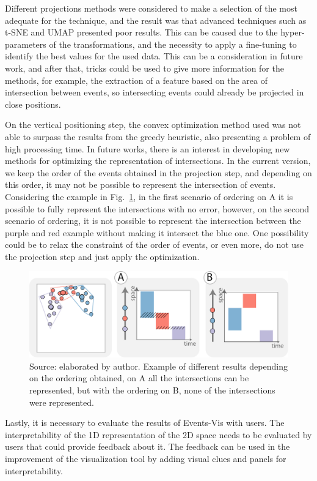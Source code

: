 Different projections methods were considered to make a selection of the most adequate for the technique, and the result was that advanced techniques such as t-SNE and UMAP presented poor results.
%
This can be caused due to the hyper-parameters of the transformations, and the necessity to apply a fine-tuning to identify the best values for the used data.
%
This can be a consideration in future work, and after that, tricks could be used to give more information for the methods, for example, the extraction of a feature based on the area of intersection between events, so intersecting events could already be projected in close positions.  

On the vertical positioning step, the convex optimization method used was not able to surpass the results from the greedy heuristic, also presenting a problem of high processing time.
%
In future works, there is an interest in developing new methods for optimizing the representation of intersections.
%
In the current version, we keep the order of the events obtained in the projection step, and depending on this order, it may not be possible to represent the intersection of events. 
%
Considering the example in Fig.~\ref{fig:discussion-projection-error}, in the first scenario of ordering on A it is possible to fully represent the intersections with no error, however, on the second scenario of ordering, it is not possible to represent the intersection between the purple and red example without making it intersect the blue one. 
%
One possibility could be to relax the constraint of the order of events, or even more, do not use the projection step and just apply the optimization.

\begin{figure}
    \centering
    \includegraphics[width = \linewidth]{src/imgs/discussion-projection-error.pdf}
    \caption{Source: elaborated by author. Example of different results depending on the ordering obtained, on A all the intersections can be represented, but with the ordering on B, none of the intersections were represented.}
    \label{fig:discussion-projection-error}
\end{figure}
Lastly, it is necessary to evaluate the results of Events-Vis with users. The interpretability of the 1D representation of the 2D space needs to be evaluated by users that could provide feedback about it.
%
The feedback can be used in the improvement of the visualization tool by adding visual clues and panels for interpretability.

